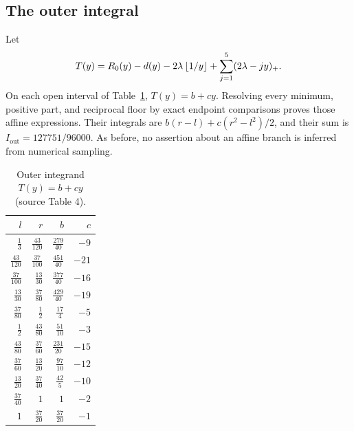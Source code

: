 \subsection{The outer integral}
Let
\[
 T(y)=R_0(y)-d(y)-2\lambda\left\lfloor 1/y\right\rfloor+\sum_{j=1}^5(2\lambda-jy)_+.
\]
On each open interval of Table~\ref{tab:outerintegrals}, $T(y)=b+cy$.
Resolving every minimum, positive part, and reciprocal floor by exact
endpoint comparisons proves those affine expressions. Their integrals
are $b(r-l)+c(r^2-l^2)/2$, and their sum is
$I_{\mathrm{out}}=127751/96000$. As before, no assertion about an affine
branch is inferred from numerical sampling.
\begin{table}[htbp]\centering\small
\caption{Outer integrand $T(y)=b+cy$ (source Table 4).}\label{tab:outerintegrals}
\renewcommand{\arraystretch}{1.65}
\begin{tabular}{rrrr}\toprule
$l$ & $r$ & $b$ & $c$\\\midrule
$\frac{1}{3}$ & $\frac{43}{120}$ & $\frac{279}{40}$ & $-9$\\
$\frac{43}{120}$ & $\frac{37}{100}$ & $\frac{451}{40}$ & $-21$\\
$\frac{37}{100}$ & $\frac{13}{30}$ & $\frac{377}{40}$ & $-16$\\
$\frac{13}{30}$ & $\frac{37}{80}$ & $\frac{429}{40}$ & $-19$\\
$\frac{37}{80}$ & $\frac{1}{2}$ & $\frac{17}{4}$ & $-5$\\
$\frac{1}{2}$ & $\frac{43}{80}$ & $\frac{51}{10}$ & $-3$\\
$\frac{43}{80}$ & $\frac{37}{60}$ & $\frac{231}{20}$ & $-15$\\
$\frac{37}{60}$ & $\frac{13}{20}$ & $\frac{97}{10}$ & $-12$\\
$\frac{13}{20}$ & $\frac{37}{40}$ & $\frac{42}{5}$ & $-10$\\
$\frac{37}{40}$ & $1$ & $1$ & $-2$\\
$1$ & $\frac{37}{20}$ & $\frac{37}{20}$ & $-1$\\
\bottomrule\end{tabular}
\end{table}

